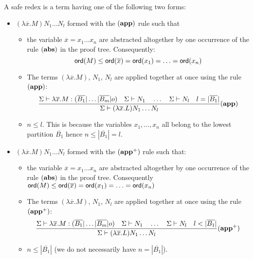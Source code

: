 \begin{dfn}
A safe redex is a term having one of the following two forms:

\begin{itemize}
    \item $(\lambda \overline{x} . M) N_1 \ldots N_l$ formed with the $\mathbf{(app)}$ rule such that
        \begin{itemize}
        \item the variable $\overline{x}=x_1\ldots x_n$ are abstracted altogether by one occurrence of the rule $\mathbf{(abs)}$ in the proof tree.
                Consequently:
                $${\sf ord}(M) \leq {\sf ord}(\overline{x}) = {\sf ord}(x_1) = \ldots = {\sf ord}(x_n)$$

        \item The terms $(\lambda \overline{x} . M)$, $N_1$, $N_l$ are applied together at once using the rule $\mathbf{(app)}$:
        $$   \frac{\displaystyle 
                    \Sigma \vdash \lambda \overline{x} . M : (\overline{B_1}|\ldots|\overline{B_m}|o)
                    \quad
                    \Sigma \vdash N_1         \quad \ldots \quad \Sigma \vdash N_l
                    \quad l = |\overline{B_1}|
            }{
            \Sigma \vdash (\lambda \overline{x} . L) N_1 \ldots N_l
            } (\mathbf{app})
        $$

        \item $n \leq l$. This is because the variables $x_1, \ldots, x_n$ all belong to the lowest partition $\overline{B_1}$ hence $n\leq |\overline{B_1}| = l$.

        \end{itemize}

\item $(\lambda \overline{x} . M) N_1 \ldots N_l$ formed with the $\mathbf{(app^+)}$ rule such that:

        \begin{itemize}
        \item the variable $\overline{x}=x_1\ldots x_n$ are abstracted altogether by one occurrence of the rule $\mathbf{(abs)}$ in the proof tree.
                Consequently  ${\sf ord}(M) \leq {\sf ord}(\overline{x}) = {\sf ord}(x_1) = \ldots = {\sf ord}(x_n)$

        \item The terms $(\lambda \overline{x} . M)$, $N_1$, $N_l$ are applied together at once using the rule $\mathbf{(app^+)}$:
        $$   \frac{\displaystyle 
                    \Sigma \vdash \lambda \overline{x} . M : (\overline{B_1}|\ldots|\overline{B_m}|o)
                    \quad
                    \Sigma \vdash N_1         \quad \ldots \quad \Sigma \vdash N_l
                    \quad l < |\overline{B_1}|
            }{
            \Sigma \vdash (\lambda \overline{x} . L) N_1 \ldots N_l
            } (\mathbf{app^+})
        $$

      \item $n \leq |\overline{B_1}|$ (we do not necessarily have $n = |\overline{B_1}|$).

        \end{itemize}

\end{itemize}
\end{dfn}


